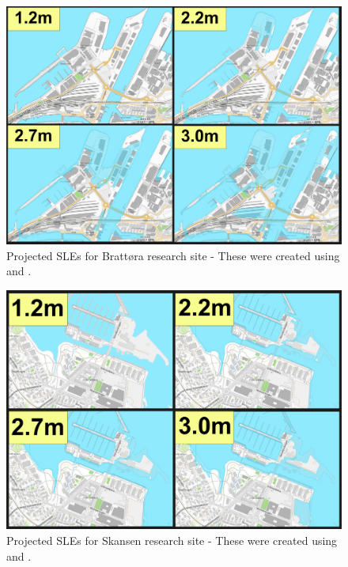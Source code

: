 \begin{figure}[H]
    \centering
    \includegraphics[width=16cm]{fig_sle/brattora-sle-num.png}
    \caption{Projected SLEs for Brattøra research site - These were created using \cite{kartverket_se_2021} and \cite{stormflo_database_stormflo_2021}. }
    \label{fig:sle-brattora-num}
\end{figure}

\begin{figure}[H]
    \centering
    \includegraphics[width=16cm]{fig_sle/grillstad-sle-num.png}
    \caption{Projected SLEs for Skansen research site - These were created using \cite{kartverket_se_2021} and \cite{stormflo_database_stormflo_2021}. }
    \label{fig:sle-grillstad-num}
\end{figure}


